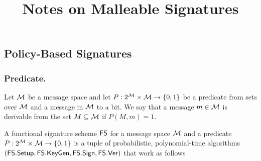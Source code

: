 \documentclass[11pt]{llncs}
\title{Notes on Malleable Signatures}
\author{}
\institute{}
\begin{document}
\maketitle



\subsection*{Policy-Based Signatures} %


\subsubsection{Predicate.}Let ${\cal M}$ be a message space and let $P: 2^{{\cal M}} \times {\cal M} \to \{0,1\}$ be
a predicate from sets over ${\cal M}$ and a message in
${\cal M}$ to a bit. We say that a message $m \in {\cal M}$
is derivable from the set $M \subseteq {\cal M}$ if $P(M,m) = 1$.

A functional signature scheme ${\sf FS}$ for a message space ${\cal M}$ and a predicate $P: 2^{{\cal M}} \times {\cal M} \to \{0,1\}$ is a tuple of probabilistic, polynomial-time algorithms
$({\sf FS.Setup}, {\sf FS.KeyGen}, {\sf FS.Sign}, {\sf FS.Ver})$ that work as follows
\end{document}
